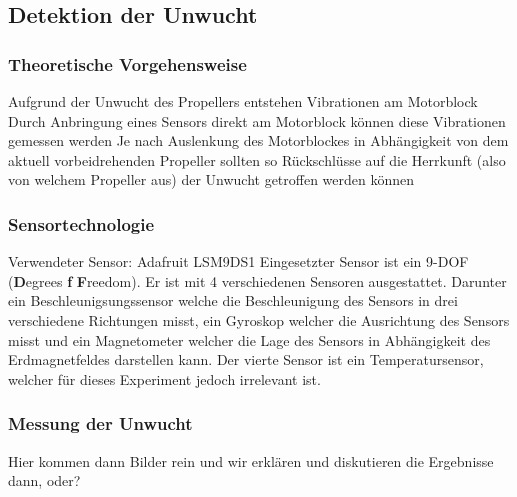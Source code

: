 \subsection{Detektion der Unwucht}

\subsubsection*{Theoretische Vorgehensweise}
Aufgrund der Unwucht des Propellers entstehen Vibrationen am Motorblock
Durch Anbringung eines Sensors direkt am Motorblock können diese Vibrationen gemessen werden
Je nach Auslenkung des Motorblockes in Abhängigkeit von dem aktuell vorbeidrehenden Propeller sollten so Rückschlüsse auf die Herrkunft (also von welchem Propeller aus) der Unwucht getroffen werden können

\subsubsection*{Sensortechnologie}
Verwendeter Sensor: Adafruit LSM9DS1
Eingesetzter Sensor ist ein 9-DOF (\textbf{D}egrees \textbf{f} \textbf{F}reedom). Er ist mit 4 verschiedenen Sensoren ausgestattet. Darunter ein Beschleunigsungssensor welche die Beschleunigung des Sensors in drei verschiedene Richtungen misst, ein Gyroskop welcher die Ausrichtung des Sensors misst und ein Magnetometer welcher die Lage des Sensors in Abhängigkeit des Erdmagnetfeldes darstellen kann. Der vierte Sensor ist ein Temperatursensor, welcher für dieses Experiment jedoch irrelevant ist.

\subsubsection*{Messung der Unwucht}
Hier kommen dann Bilder rein und wir erklären und diskutieren die Ergebnisse dann, oder?

